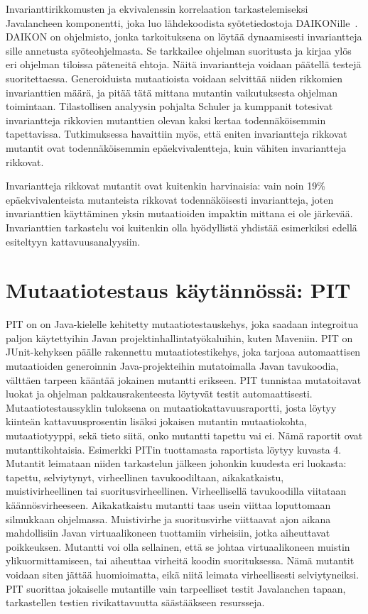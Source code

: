 \documentclass[finnish]{tktltiki2}
\begin{document}
Invarianttirikkomusten ja ekvivalenssin korrelaation tarkastelemiseksi Javalancheen komponentti, joka luo lähdekoodista syöte\-tiedosto\-ja DAIKON\-ille~\cite{ErnstPGMPTX2007}. DAIKON on ohjelmisto, jonka tarkoituksena on löytää dynaamisesti invariantteja sille annetusta syöteohjelmasta. Se tarkkailee ohjelman suoritusta ja kirjaa ylös eri ohjelman tiloissa päteneitä ehtoja. Näitä invariantteja voidaan päätellä testejä suoritettaessa. Generoiduista mutaatioista voidaan selvittää niiden rikkomien invarianttien määrä, ja pitää tätä mittana mutantin vaikutuksesta ohjelman toimintaan. Tilastollisen analyysin pohjalta Schuler ja kumppanit totesivat invariantteja rikkovien mutanttien olevan kaksi kertaa todennäköisemmin tapettavissa. Tutkimuksessa havaittiin myös, että eniten invariantteja rikkovat mutantit ovat todennäköisemmin epäekvivalentteja, kuin vähiten invariantteja rikkovat. 

Invariantteja rikkovat mutantit ovat kuitenkin harvinaisia: vain noin 19\% epäekvivalenteista mutanteista rikkovat todennäköisesti invariantteja, joten invarianttien käyttäminen yksin mutaatioiden impaktin mittana ei ole järkevää. Invarianttien tarkastelu voi kuitenkin olla hyödyllistä yhdistää esimerkiksi edellä esiteltyyn kattavuusanalyysiin.

\section{Mutaatiotestaus käytännössä: PIT}
PIT on on Java-kielelle kehitetty mutaatiotestauskehys, joka saadaan integroitua paljon käytettyihin Javan projektinhallintatyökaluihin, kuten Maveniin. PIT on JUnit-kehyksen päälle rakennettu mutaatiotestikehys, joka tarjoaa automaattisen mutaatioiden generoinnin Java-projekteihin mutatoimalla Javan tavukoodia, välttäen tarpeen kääntää jokainen mutantti erikseen. PIT tunnistaa mutatoitavat luokat ja ohjelman pakkausrakenteesta löytyvät testit automaattisesti. Mutaatiotestaussyklin tuloksena on mutaatiokattavuusraportti, josta löytyy kiinteän kattavuusprosentin lisäksi jokaisen mutantin mutaatiokohta, mutaatiotyyppi, sekä tieto siitä, onko mutantti tapettu vai ei. Nämä raportit ovat mutanttikohtaisia. Esimerkki PITin tuottamasta raportista löytyy kuvasta 4. Mutantit leimataan niiden tarkastelun jälkeen johonkin kuudesta eri luokasta: tapettu, selviytynyt, virheellinen tavukoodiltaan, aikakatkaistu, muistivirheellinen tai suoritusvirheellinen. Virheellisellä tavukoodilla viitataan käännösvirheeseen. Aikakatkaistu mutantti taas usein viittaa loputtomaan silmukkaan ohjelmassa. Muistivirhe ja suoritusvirhe viittaavat ajon aikana mahdollisiin Javan virtuaalikoneen tuottamiin virheisiin, jotka aiheuttavat poikkeuksen. Mutantti voi olla sellainen, että se johtaa virtuaalikoneen muistin ylikuormittamiseen, tai aiheuttaa virheitä koodin suorituksessa. Nämä mutantit voidaan siten jättää huomioimatta, eikä niitä leimata virheellisesti selviytyneiksi. PIT suorittaa jokaiselle mutantille vain tarpeelliset testit Javalanchen tapaan, tarkastellen testien rivikattavuutta säästääkseen resursseja.
\end{document}
